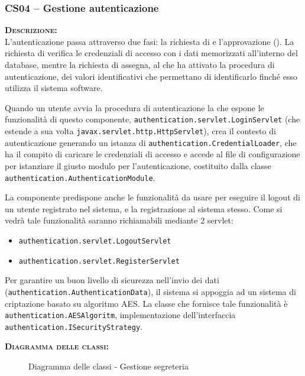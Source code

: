 \subsubsection{CS04 -- Gestione autenticazione}\label{sec:cs04}
\begin{description}
  \item{\scshape\bfseries Descrizione:}\\
L'autenticazione passa attraverso due fasi: la richiesta di  e l'approvazione (). La richiesta di  verifica le credenziali di accesso con i dati memorizzati all'interno del database, mentre la richiesta di  assegna, al  che ha attivato la procedura di autenticazione, dei valori identificativi che permettano di identificarlo finché esso utilizza il sistema software.

Quando un utente avvia la procedura di autenticazione la  che espone le funzionalità di questo componente, \texttt{authentication.servlet.LoginServlet} (che estende a sua volta \texttt{javax.servlet.http.HttpServlet}), crea il contesto di autenticazione generando un istanza di \texttt{authentication.CredentialLoader}, che ha il compito di caricare le credenziali di accesso e accede al file di configurazione per istanziare il giusto modulo per l'autenticazione, costituito dalla classe \texttt{authentication.AuthenticationModule}.

La componente predispone anche le funzionalità da usare per eseguire il logout di un utente registrato nel sistema, e la registrazione al sistema stesso. Come si vedrà tale funzionalità saranno richiamabili mediante 2 servlet:
\begin{itemize}
	\item \texttt{authentication.servlet.LogoutServlet}
	\item \texttt{authentication.servlet.RegisterServlet}
\end{itemize}

Per garantire un buon livello di sicurezza nell'invio dei dati (\texttt{authentication.AuthenticationData}), il sistema si appoggia ad un sistema di criptazione basato su algoritmo AES. La classe che fornisce tale funzionalità è \texttt{authentication.AESAlgoritm}, implementazione dell'interfaccia \texttt{authentication.ISecurityStrategy}.
  
  \item{\scshape\bfseries Diagramma delle classi:}
\begin{figure}[H]
  \centering
  \caption{Diagramma delle classi - Gestione segreteria}\label{fig:gestioneautenticazione}
\end{figure}	
  

\end{description}
